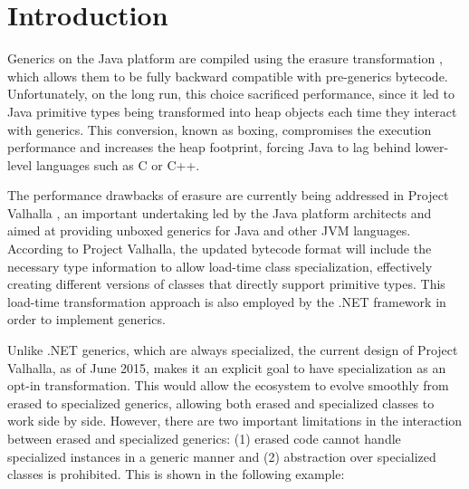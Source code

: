 \section{Introduction}
\label{sec:intro}

Generics on the Java platform are compiled using the erasure transformation \cite{java-erasure}, which allows them to be fully backward compatible with pre-generics bytecode. Unfortunately, on the long run, this choice sacrificed performance, since it led to Java primitive types being transformed into heap objects each time they interact with generics. This conversion, known as boxing, compromises the execution performance and increases the heap footprint, forcing Java to lag behind lower-level languages such as C or C++.

The performance drawbacks of erasure are currently being addressed in Project Valhalla \cite{goetz-specialization, rose-value-classes-tearing, rose-value-classes-vm}, an important undertaking led by the Java platform architects and aimed at providing unboxed generics for Java and other JVM languages. According to Project Valhalla, the updated bytecode format will include the necessary type information to allow load-time class specialization, effectively creating different versions of classes that directly support primitive types. This load-time transformation approach is also employed by the .NET framework \cite{dot-net-generics, dot-net-generics-form} in order to implement generics.


Unlike .NET generics, which are always specialized, the current design of Project Valhalla, as of June 2015, makes it an explicit goal to have specialization as an opt-in transformation. This would allow the ecosystem to evolve smoothly from erased to specialized generics, allowing both erased and specialized classes to work side by side. However, there are two important limitations in the interaction between erased and specialized generics: (1) erased code cannot handle specialized instances in a generic manner and (2) abstraction over specialized classes is prohibited. This is shown in the following example:

